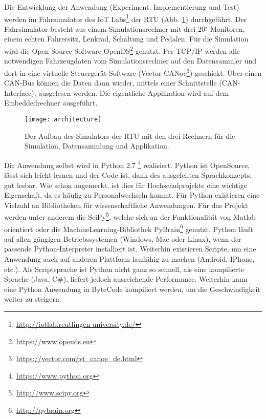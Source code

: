\label{chap:infrastructure}
Die Entwicklung der Anwendung (Experiment, Implementierung und Test) werden im Fahrsimulator des IoT Labs\footnote{\url{http://iotlab.reutlingen-university.de/}} der \acl{RTU} (Abb. \ref{fig:architecure}) durchgeführt. 
Der Fahrsimulator besteht aus einem Simulationsrechner mit drei 20" Monitoren, einem echten Fahrersitz, Lenkrad, Schaltung und Pedalen. Für die Simulation wird die Open-Source Software OpenDS\footnote{\url{https://www.opends.eu}} genutzt. Per TCP/IP werden alle notwendigen Fahrzeugdaten vom Simulationsrechner auf den Datensammler und dort in eine virtuelle Steuergerät-Software (Vector CANoe\footnote{\url{https://vector.com/vi_canoe_de.html}}) geschickt. Über einen CAN-Bus können die Daten dann wieder, mittels einer Schnittstelle (CAN-Interface), ausgelesen werden. Die eigentliche Applikation wird auf dem Embeddedrechner ausgeführt.

\begin{figure}[h] 
  \begin{center}
    \texttt{[image: architecture]}
    \caption[Aufbau des Simulators]{Der Aufbau des Simulators der \acl{RTU} mit den drei Rechnern für die Simulation, Datensammlung und Applikation. \label{fig:architecure}}
  \end{center}
\end{figure}

Die Anwendung selbst wird in Python 2.7 \footnote{\url{https://www.python.org}} realisiert. Python ist OpenSource, lässt sich leicht lernen und der Code ist, dank des ausgefeilten Sprachkonzepts, gut lesbar. Wie schon angemerkt, ist dies für Hochschulprojekte eine wichtige Eigenschaft, da es häufig zu Personalwechseln kommt. Für Python existieren eine Vielzahl an Bibliotheken für wissenschaftliche Anwendungen. Für das Projekt werden unter anderem die SciPy\footnote{\url{http://www.scipy.org}}, welche sich an der Funktionalität von Matlab orientiert oder die MachineLearning-Bibliothek PyBrain\footnote{\url{http://pybrain.org}} genutzt. Python läuft auf allen gängigen Betriebssystemen (Windows, Mac oder Linux), wenn der passende Python-Interpreter installiert ist. Weiterhin existieren Scripte, um eine Anwendung auch auf anderen Plattform lauffähig zu machen (Android, IPhone, etc.). Als Scriptsprache ist Python nicht ganz so schnell, als eine kompilierte Sprache (Java, C\#), liefert jedoch ausreichende Performance. Weiterhin kann eine Python Anwendung in ByteCode kompiliert werden, um die Geschwindigkeit weiter zu steigern. 

